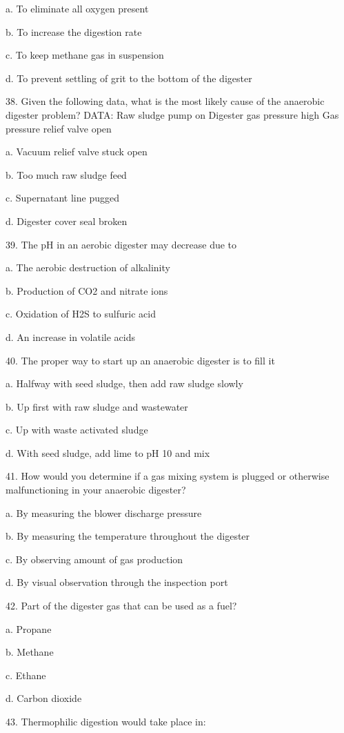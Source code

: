 \documentclass{article}
\begin{document}
a. To eliminate all oxygen present 

b. To increase the digestion rate 

c. To keep methane gas in suspension 

d. To prevent settling of grit to the bottom of the digester 


38. Given the following data, what is the most likely cause of the anaerobic digester problem?
DATA: Raw sludge pump on
Digester gas pressure high
Gas pressure relief valve open 

a. Vacuum relief valve stuck open 

b. Too much raw sludge feed 

c. Supernatant line pugged 

d. Digester cover seal broken 


39. The pH in an aerobic digester may decrease due to 

a. The aerobic destruction of alkalinity 

b. Production of CO2 and nitrate ions 

c. Oxidation of H2S to sulfuric acid 

d. An increase in volatile acids 


40. The proper way to start up an anaerobic digester is to fill it 

a. Halfway with seed sludge, then add raw sludge slowly 

b. Up first with raw sludge and wastewater 

c. Up with waste activated sludge 

d. With seed sludge, add lime to pH 10 and mix 


41. How would you determine if a gas mixing system is plugged or otherwise malfunctioning in your anaerobic digester? 

a. By measuring the blower discharge pressure 

b. By measuring the temperature throughout the digester 

c. By observing amount of gas production 

d. By visual observation through the inspection port 


42. Part of the digester gas that can be used as a fuel? 

a. Propane 

b. Methane 

c. Ethane 

d. Carbon dioxide 


43. Thermophilic digestion would take place in: 
\end{document}
